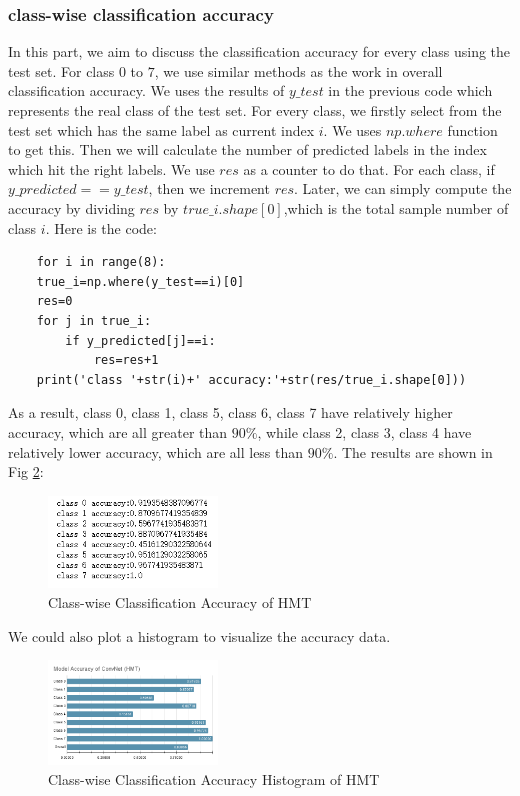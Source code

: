 \documentclass[conference]{IEEEtran}
\begin{document}
\subsubsection{class-wise classification accuracy}
In this part, we aim to discuss the classification accuracy for every class using the test set. 
For class $0$ to $7$, we use similar methods as the work in overall classification accuracy. 
We uses the results of $y\_test$ in the previous code which represents the real class of the test set. For every class, we firstly select from the test set which has the same label as current index $i$.
We uses $np.where$ function to get this. Then we will calculate the number of predicted labels in the index which hit the right labels. We use $res$ as a counter to do that.
For each class, if $y\_predicted == y\_test$, then we increment $res$.
Later, we can simply compute the accuracy by dividing $res$ by $true\_i.shape[0]$,which is the total sample number of class $i$.
Here is the code:
\begin{lstlisting}
    for i in range(8):
    true_i=np.where(y_test==i)[0]
    res=0
    for j in true_i:
        if y_predicted[j]==i:
            res=res+1
    print('class '+str(i)+' accuracy:'+str(res/true_i.shape[0]))
\end{lstlisting}
As a result, class 0, class 1, class 5, class 6, class 7 have relatively higher accuracy, which are all greater than $90\%$, while class 2, class 3, class 4 have relatively lower accuracy, which are all less than $90\%$.
The results are shown in Fig \ref{Fig.t3q2}:
\begin{figure}[h] 
    \centering
    \includegraphics[width=0.4\textwidth]{./graphs/T3Q1b.png}
    \caption{Class-wise Classification Accuracy of HMT} 
    \label{Fig.t3q2} 
\end{figure}
We could also plot a histogram to visualize the accuracy data.
\begin{figure}[h] 
    \centering
    \includegraphics[width=0.4\textwidth]{./pics/HMT/acc.png}
    \caption{Class-wise Classification Accuracy Histogram of HMT} 
    \label{Fig.t3q2} 
\end{figure}
\end{document}
